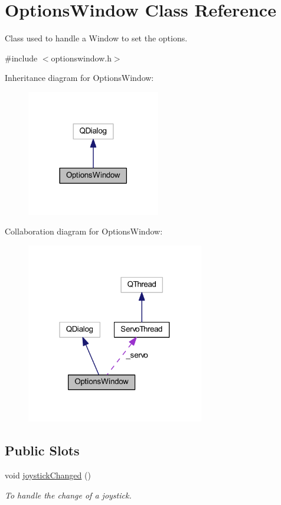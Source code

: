 \hypertarget{a00006}{}\section{Options\+Window Class Reference}
\label{a00006}


Class used to handle a Window to set the options.  




{\ttfamily \#include $<$optionswindow.\+h$>$}



Inheritance diagram for Options\+Window\+:\nopagebreak
\begin{figure}[H]
\begin{center}
\leavevmode
\includegraphics[width=165pt]{db/df3/a00034}
\end{center}
\end{figure}


Collaboration diagram for Options\+Window\+:\nopagebreak
\begin{figure}[H]
\begin{center}
\leavevmode
\includegraphics[width=220pt]{d4/d8c/a00035}
\end{center}
\end{figure}
\subsection*{Public Slots}
\begin{DoxyCompactItemize}
\item 
void \hyperlink{a00006_ae8c0373be58da710194f8d14f1c3c4dc}{joystick\+Changed} ()
\begin{DoxyCompactList}\small\item\em To handle the change of a joystick. \end{DoxyCompactList}\end{DoxyCompactItemize}
